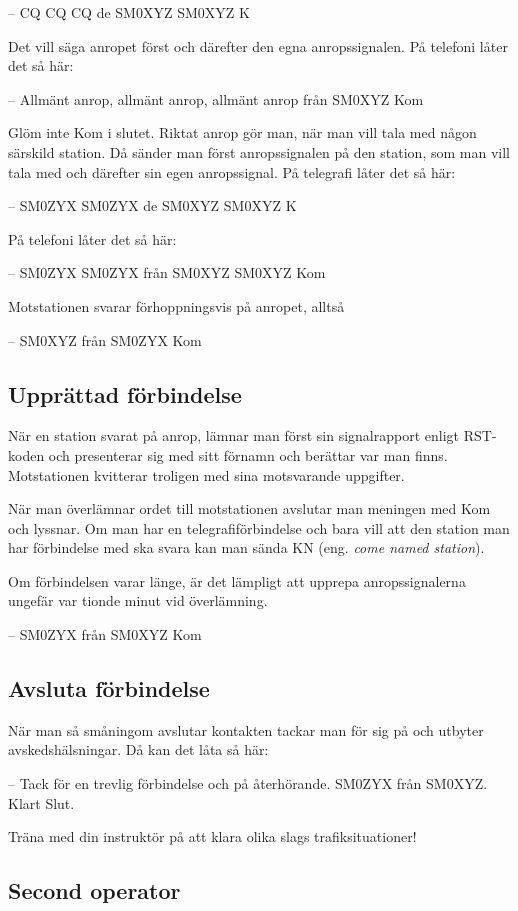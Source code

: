 -- CQ CQ CQ de SM0XYZ SM0XYZ K

Det vill säga anropet först och därefter den egna anropssignalen.
På telefoni låter det så här:

-- Allmänt anrop, allmänt anrop, allmänt anrop från SM0XYZ Kom

Glöm inte Kom i slutet.
Riktat anrop gör man, när man vill tala med någon särskild station.
Då sänder man först anropssignalen på den station, som man vill tala med och
därefter sin egen anropssignal.
På telegrafi låter det så här:

-- SM0ZYX SM0ZYX de SM0XYZ SM0XYZ K

På telefoni låter det så här:

-- SM0ZYX SM0ZYX från SM0XYZ SM0XYZ Kom

Motstationen svarar förhoppningsvis på anropet, alltså

-- SM0XYZ från SM0ZYX Kom

\subsection{Upprättad förbindelse}

När en station svarat på anrop, lämnar man först sin signalrapport enligt
RST-koden och presenterar sig med sitt förnamn och berättar var man finns.
Motstationen kvitterar troligen med sina motsvarande uppgifter.

När man överlämnar ordet till motstationen avslutar man meningen med Kom och
lyssnar.
Om man har en telegrafiförbindelse och bara vill att den station man har
förbindelse med ska svara kan man sända KN (eng. \emph{come named station}).

Om förbindelsen varar länge, är det lämpligt att upprepa anropssignalerna
ungefär var tionde minut vid överlämning.

-- SM0ZYX från SM0XYZ Kom

\subsection{Avsluta förbindelse}

När man så småningom avslutar kontakten tackar man för sig på och utbyter
avskedshälsningar. Då kan det låta så här:

-- Tack för en trevlig förbindelse och på återhörande. SM0ZYX från
SM0XYZ. Klart Slut.

Träna med din instruktör på att klara olika slags trafiksituationer!

\subsection{Second operator}
\label{secondoperator}

